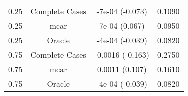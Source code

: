 \begin{table}[ht]
\centering
\begin{tabular}{cccc}
  \hline
  \hline
0.25 & Complete Cases & -7e-04 (-0.073) & 0.1090 \\ 
  0.25 & mcar & 7e-04 (0.067) & 0.0950 \\ 
  0.25 & Oracle & -4e-04 (-0.039) & 0.0820 \\ 
  0.75 & Complete Cases & -0.0016 (-0.163) & 0.2750 \\ 
  0.75 & mcar & 0.0011 (0.107) & 0.1610 \\ 
  0.75 & Oracle & -4e-04 (-0.039) & 0.0820 \\ 
   \hline
\end{tabular}
\end{table}
